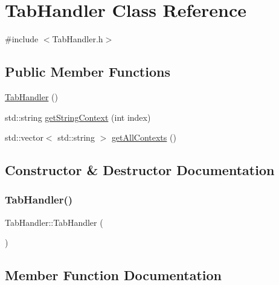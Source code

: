 \hypertarget{class_tab_handler}{}\section{Tab\+Handler Class Reference}
\label{class_tab_handler}


{\ttfamily \#include $<$Tab\+Handler.\+h$>$}

\subsection*{Public Member Functions}
\begin{DoxyCompactItemize}
\item 
\hyperlink{class_tab_handler_a0db74769c062530015f118c22a4bce33}{Tab\+Handler} ()
\item 
std\+::string \hyperlink{class_tab_handler_afcefa94c308a90bba358dd371fa3c39b}{get\+String\+Context} (int index)
\item 
std\+::vector$<$ std\+::string $>$ \hyperlink{class_tab_handler_a58e032ec707727233e06ab8541de29a5}{get\+All\+Contexts} ()
\end{DoxyCompactItemize}


\subsection{Constructor \& Destructor Documentation}
\mbox{\label{class_tab_handler_a0db74769c062530015f118c22a4bce33}} 
\subsubsection{\texorpdfstring{Tab\+Handler()}{TabHandler()}}
{\footnotesize\ttfamily Tab\+Handler\+::\+Tab\+Handler (\begin{DoxyParamCaption}{ }\end{DoxyParamCaption})}



\subsection{Member Function Documentation}
\mbox{\label{class_tab_handler_a58e032ec707727233e06ab8541de29a5}} 
